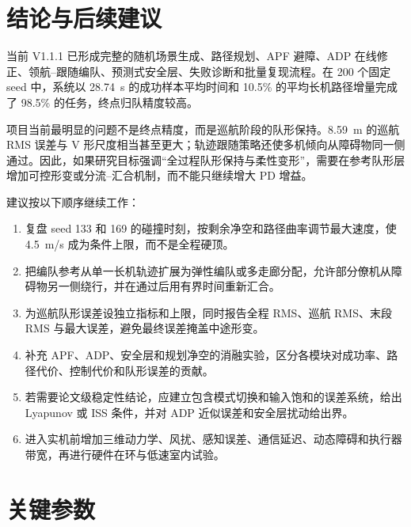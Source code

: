 \documentclass[UTF8,a4paper,12pt,fontset=windows]{ctexart}
\begin{document}
\section{结论与后续建议}

当前 V1.1.1 已形成完整的随机场景生成、路径规划、APF 避障、ADP 在线修正、领航--跟随编队、预测式安全层、失败诊断和批量复现流程。在 200 个固定 seed 中，系统以 \SI{28.74}{s} 的成功样本平均时间和 10.5\% 的平均长机路径增量完成了 98.5\% 的任务，终点归队精度较高。

项目当前最明显的问题不是终点精度，而是巡航阶段的队形保持。\SI{8.59}{m} 的巡航 RMS 误差与 V 形尺度相当甚至更大；轨迹跟随策略还使多机倾向从障碍物同一侧通过。因此，如果研究目标强调“全过程队形保持与柔性变形”，需要在参考队形层增加可控形变或分流--汇合机制，而不能只继续增大 PD 增益。

建议按以下顺序继续工作：
\begin{enumerate}
  \item 复盘 seed 133 和 169 的碰撞时刻，按剩余净空和路径曲率调节最大速度，使 \SI{4.5}{m/s} 成为条件上限，而不是全程硬顶。
  \item 把编队参考从单一长机轨迹扩展为弹性编队或多走廊分配，允许部分僚机从障碍物另一侧绕行，并在通过后用有界时间重新汇合。
  \item 为巡航队形误差设独立指标和上限，同时报告全程 RMS、巡航 RMS、末段 RMS 与最大误差，避免最终误差掩盖中途形变。
  \item 补充 APF、ADP、安全层和规划净空的消融实验，区分各模块对成功率、路径代价、控制代价和队形误差的贡献。
  \item 若需要论文级稳定性结论，应建立包含模式切换和输入饱和的误差系统，给出 Lyapunov 或 ISS 条件，并对 ADP 近似误差和安全层扰动给出界。
  \item 进入实机前增加三维动力学、风扰、感知误差、通信延迟、动态障碍和执行器带宽，再进行硬件在环与低速室内试验。
\end{enumerate}

\appendix

\section{关键参数}
\end{document}
